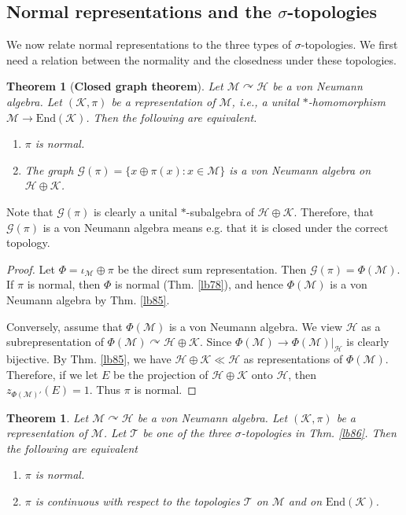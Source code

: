\documentclass[12pt,b5paper,notitlepage]{article}
\theoremstyle{definition}
\theoremstyle{plain}
\newtheorem{thm}[df]{Theorem}
\newcommand{\mc}{\mathcal}
\newcommand{\End}{\mathrm{End}} %
\newcommand{\scr}{\mathscr}
\numberwithin{equation}{section}
\begin{document}
\subsection*{Normal representations and the $\sigma$-topologies}


We now relate normal representations to the three types of $\sigma$-topologies. We first need a relation between the normality and the closedness under these topologies.


\begin{thm}[\textbf{Closed graph theorem}]\label{lb87}
Let $\mc M\curvearrowright\mc H$ be a von Neumann algebra. Let $(\mc K,\pi)$ be a representation of $\mc M$, i.e., a unital $*$-homomorphism $\mc M\rightarrow\End(\mc K)$. Then the following are equivalent.
\begin{enumerate}
\item[(1)] $\pi$ is normal.
\item[(2)] The graph $\scr G(\pi)=\{x\oplus\pi(x):x\in\mc M\}$ is a von Neumann algebra on $\mc H\oplus\mc K$.
\end{enumerate}
\end{thm}

Note that $\scr G(\pi)$ is clearly a unital $*$-subalgebra of $\mc H\oplus\mc K$. Therefore, that $\scr G(\pi)$ is a von Neumann algebra means e.g. that it is closed under the correct topology. 


\begin{proof}
Let $\Phi=\iota_{\mc M}\oplus\pi$ be the direct sum representation. Then $\scr G(\pi)=\Phi(\mc M)$. If $\pi$ is normal, then $\Phi$ is normal (Thm. \ref{lb78}), and hence $\Phi(\mc M)$ is a von Neumann algebra by Thm. \ref{lb85}.

Conversely, assume that $\Phi(\mc M)$ is a von Neumann algebra. We view $\mc H$ as a subrepresentation of $\Phi(\mc M)\curvearrowright \mc H\oplus\mc K$. Since $\Phi(\mc M)\rightarrow\Phi(\mc M)|_{\mc H}$ is clearly bijective. By Thm. \ref{lb85}, we have $\mc H\oplus\mc K\ll\mc H$ as representations of $\Phi(\mc M)$. Therefore, if we let $E$ be the projection of $\mc H\oplus\mc K$ onto $\mc H$, then $z_{\Phi(\mc M)'}(E)=1$. Thus $\pi$ is normal.
\end{proof}






\begin{thm}\label{lb84}
Let $\mc M\curvearrowright\mc H$ be a von Neumann algebra. Let $(\mc K,\pi)$ be a representation of $\mc M$. Let $\mc T$ be one of the three $\sigma$-topologies in Thm. \ref{lb86}. Then the following are equivalent
\begin{enumerate}
\item[(1)]  $\pi$ is normal.
\item[(2)] $\pi$ is continuous with respect to the topologies $\mc T$ on $\mc M$ and on $\End(\mc K)$.
\end{enumerate}
\end{thm}
\end{document}

